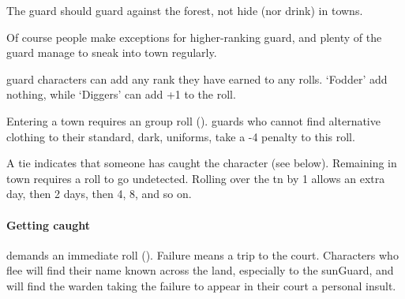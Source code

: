\begin{multicols}{2}
The \gls{guard} should guard against the forest, not hide (nor drink) in towns.

Of course people make exceptions for higher-ranking \gls{guard}, and plenty of the guard manage to sneak into town regularly.

\Gls{guard} characters can add any rank they have earned to any rolls.
`Fodder' add nothing, while `Diggers' can add +1 to the roll.


Entering a town requires an  group roll (\tn[7]).
\Glspl{guard} who cannot find alternative clothing to their standard, dark, uniforms, take a -4 penalty to this roll.

A tie indicates that someone has caught the character (see below).
Remaining in town requires a  roll to go undetected.
Rolling over the \gls{tn} by 1 allows an extra day, then 2 days, then 4, 8, and so on.

\paragraph{Getting caught}
demands an immediate  roll (\tn[10]).
Failure means a trip to the \gls{court}.
Characters who flee will find their name known across the land, especially to the \gls{sunGuard}, and will find the \gls{warden} taking the failure to appear in their \gls{court} a personal insult.


\end{multicols}
